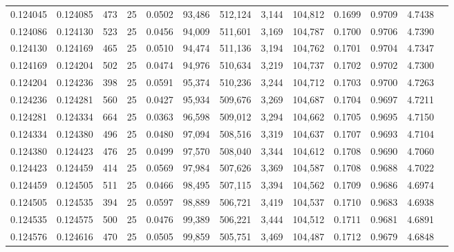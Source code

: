 \begin{tabular}{rrrrrrrrrrrrr}
0.124045 & 0.124085 &   473 &  25 &                                     0.0502 &  93,486 & 512,124 &   3,144 & 104,812 & 0.1699 & 0.9709 & 4.7438 \\
0.124086 & 0.124130 &   523 &  25 &                                     0.0456 &  94,009 & 511,601 &   3,169 & 104,787 & 0.1700 & 0.9706 & 4.7390 \\
0.124130 & 0.124169 &   465 &  25 &                                     0.0510 &  94,474 & 511,136 &   3,194 & 104,762 & 0.1701 & 0.9704 & 4.7347 \\
0.124169 & 0.124204 &   502 &  25 &                                     0.0474 &  94,976 & 510,634 &   3,219 & 104,737 & 0.1702 & 0.9702 & 4.7300 \\
0.124204 & 0.124236 &   398 &  25 &                                     0.0591 &  95,374 & 510,236 &   3,244 & 104,712 & 0.1703 & 0.9700 & 4.7263 \\
0.124236 & 0.124281 &   560 &  25 &                                     0.0427 &  95,934 & 509,676 &   3,269 & 104,687 & 0.1704 & 0.9697 & 4.7211 \\
0.124281 & 0.124334 &   664 &  25 &                                     0.0363 &  96,598 & 509,012 &   3,294 & 104,662 & 0.1705 & 0.9695 & 4.7150 \\
0.124334 & 0.124380 &   496 &  25 &                                     0.0480 &  97,094 & 508,516 &   3,319 & 104,637 & 0.1707 & 0.9693 & 4.7104 \\
0.124380 & 0.124423 &   476 &  25 &                                     0.0499 &  97,570 & 508,040 &   3,344 & 104,612 & 0.1708 & 0.9690 & 4.7060 \\
0.124423 & 0.124459 &   414 &  25 &                                     0.0569 &  97,984 & 507,626 &   3,369 & 104,587 & 0.1708 & 0.9688 & 4.7022 \\
0.124459 & 0.124505 &   511 &  25 &                                     0.0466 &  98,495 & 507,115 &   3,394 & 104,562 & 0.1709 & 0.9686 & 4.6974 \\
0.124505 & 0.124535 &   394 &  25 &                                     0.0597 &  98,889 & 506,721 &   3,419 & 104,537 & 0.1710 & 0.9683 & 4.6938 \\
0.124535 & 0.124575 &   500 &  25 &                                     0.0476 &  99,389 & 506,221 &   3,444 & 104,512 & 0.1711 & 0.9681 & 4.6891 \\
0.124576 & 0.124616 &   470 &  25 &                                     0.0505 &  99,859 & 505,751 &   3,469 & 104,487 & 0.1712 & 0.9679 & 4.6848 \\

\end{tabular}
